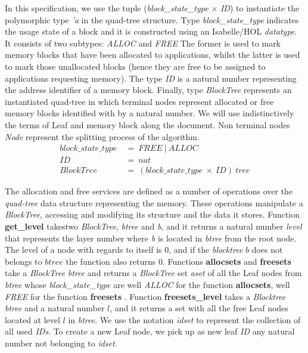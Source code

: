 In this specification, we use {the tuple} (\emph{block\_state\_type} $\times$ \emph{ID}) to instantiate the polymorphic {type} \emph{'a} in the quad-tree structure. Type \emph{block\_state\_type} {indicates} the usage state of a block {and it is constructed using an Isabelle/HOL \emph{datatype}}. It consists of two subtypes{:} \emph{ALLOC} and \emph{FREE} {The former is used to mark memory blocks that have been allocated to applications, whilst the latter is used to mark those unallocated blocks (hence they are free to be assigned to applications requesting memory)}. {The type \emph{ID} is a natural number representing the} address identifier of a memory block. Finally, type \emph{BlockTree} represents an instantiated quad-tree {in which terminal nodes represent allocated or free memory blocks identified with by a natural number. We will use indistinctively the terms of Leaf and memory block along the document}. Non terminal nodes \emph{Node} represent the splitting process of the algorithm. 
{\footnotesize
	\begin{align*}
	block\_state\_type\ &=\ FREE\ |\ ALLOC \\
	ID\ &=\ nat \\
	BlockTree\ &=\ (block\_state\_type\ \times\ ID)\ tree
	\end{align*}
}

{The allocation and free services are defined as a number of operations over the \emph{quad-tree} data structure representing the memory. These operations manipulate a \textsl{BlockTree}, accessing and modifying its structure and the data it stores}. Function \textbf{get\_level} takes{two \emph{BlockTree}, \emph{btree} and \emph{b}}, {and it returns a natural number \emph{level}} {that} represents the layer number {where} \emph{b} {is located} in \emph{btree} from the root node. {The level of a node with regards to itself is $0$, and if the \emph{blocktree} $b$ does not belongs to $btree$ the function also returns $0$.}  Functions \textbf{allocsets} and \textbf{freesets} take a \emph{BlockTree} \emph{btree} and returns a \emph{BlockTree} set \emph{aset} of all the Leaf nodes from \emph{btree} whose \emph{block\_state\_type} are well \emph{ALLOC} for the function \textbf{allocsets}, well \emph{FREE} for the function \textbf{freesets}  . Function \textbf{freesets\_level} takes a \emph{Blocktree} \emph{btree} and a natural number $l$, and it returns a set with all the free Leaf nodes located at level $l$ in \emph{btree}. We use {the} notation \emph{idset} to represent the collection of all used \emph{IDs}. To create a new Leaf node, we {pick up as new leaf \emph{ID} any natural number not belonging to \emph{idset}}.


